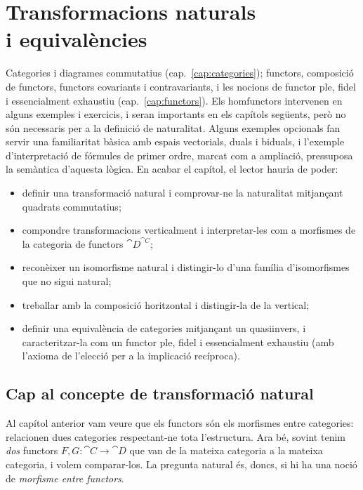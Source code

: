 \chapter[Transformacions naturals]{\texorpdfstring{Transformacions naturals\\ i equivalències}{Transformacions naturals i equivalències}}
\label{cap:transformacions}

\begin{objectius}
 Categories i diagrames commutatius (cap.~\ref{cap:categories}); functors, composició de functors, functors covariants i contravariants, i les nocions de functor ple, fidel i essencialment exhaustiu (cap.~\ref{cap:functors}). Els homfunctors intervenen en alguns exemples i exercicis, i seran importants en els capítols següents, però no són necessaris per a la definició de naturalitat. Alguns exemples opcionals fan servir una familiaritat bàsica amb espais vectorials, duals i biduals, i l'exemple d'interpretació de fórmules de primer ordre, marcat com a ampliació, pressuposa la semàntica d'aquesta lògica.
 En acabar el capítol, el lector hauria de poder:
\begin{itemize}
  \item definir una transformació natural i comprovar-ne la naturalitat mitjançant quadrats commutatius;
  \item compondre transformacions verticalment i interpretar-les com a morfismes de la categoria de functors $\cat{D}^{\cat{C}}$;
  \item reconèixer un isomorfisme natural i distingir-lo d'una família d'isomorfismes que no sigui natural;
  \item treballar amb la composició horitzontal i distingir-la de la vertical;
  \item definir una equivalència de categories mitjançant un quasiinvers, i caracteritzar-la com un functor ple, fidel i essencialment exhaustiu (amb l'axioma de l'elecció per a la implicació recíproca).
\end{itemize}
\end{objectius}

\section{Cap al concepte de transformació natural}\label{sec:cap-transformacio}

Al capítol anterior vam veure que els functors són els morfismes entre categories: relacionen dues categories respectant-ne tota l'estructura. Ara bé, sovint tenim \emph{dos} functors $F,G\colon\cat{C}\to\cat{D}$ que van de la mateixa categoria a la mateixa categoria, i volem comparar-los. La pregunta natural és, doncs, si hi ha una noció de \emph{morfisme entre functors}.

